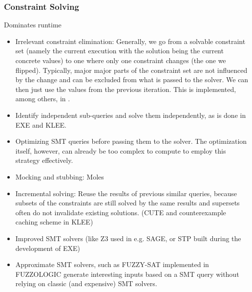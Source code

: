 \documentclass{article}
\begin{document}
\begin{multicols}{2}
    \subsubsection{Constraint Solving}
    \label{ConstraintSolving}
    Dominates runtime
    \begin{itemize}
        \item Irrelevant constraint elimination: Generally, we go from a solvable constraint set (namely the current execution with the solution being the current concrete values) to one where only one constraint changes (the one we flipped). Typically, major major parts of the constraint set are not influenced by the change and can be excluded from what is passed to the solver. We can then just use the values from the previous iteration. This is implemented, among others, in \cite{SAGE}.
        \item Identify independent sub-queries and solve them independently, as is done in EXE\cite{EXE} and KLEE\cite{KLEE}.
        \item Optimizing SMT queries before passing them to the solver. The optimization itself, however, can already be too complex to compute to employ this strategy effectively.
        \item Mocking and stubbing: Moles\cite{Moles}
        \item Incremental solving: Reuse the results of previous similar queries, because subsets of the constraints are still solved by the same results and supersets often do not invalidate existing solutions. (CUTE\cite{CUTE} and counterexample caching scheme in KLEE\cite{KLEE})
        \item Improved SMT solvers (like Z3\cite{Z3} used in e.g. SAGE\cite{SAGE}, or STP\cite{STP} built during the development of EXE\cite{EXE})
        \item Approximate SMT solvers, such as FUZZY-SAT implemented in FUZZOLOGIC\cite{FUZZOLIC} generate interesting inputs based on a SMT query without relying on classic (and expensive) SMT solvers.
    \end{itemize}


\end{multicols}
\end{document}

